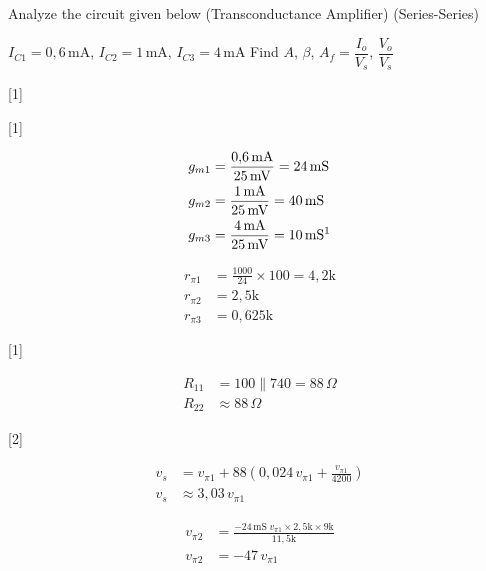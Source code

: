 \documentclass[11pt,a4paper]{article}
\begin{document}

\begin{ornek}
  Analyze the circuit given below (Transconductance Amplifier) (Series-Series)

  $I_{C1} = 0{,}6\,\mathrm{mA}$, $I_{C2} = 1\,\mathrm{mA}$, $I_{C3} = 4\,\mathrm{mA}$ \quad [$\beta = 100$, $r_o = \infty$] \quad Find $A$, $\beta$, $A_f = \dfrac{I_o}{V_s}$, $\dfrac{V_o}{V_s}$
\end{ornek}

[1]

[1]

\begin{align*}
  g_{m1} &= \frac{0{,}6\,\mathrm{mA}}{25\,\mathrm{mV}} = 24\,\mathrm{mS} \\
  g_{m2} &= \frac{1\,\mathrm{mA}}{25\,\mathrm{mV}} = 40\,\mathrm{mS} \\
  g_{m3} &= \frac{4\,\mathrm{mA}}{25\,\mathrm{mV}} = 10\,\mathrm{mS}\text{\footnotemark}
\end{align*}

\begin{align*}
  r_{\pi1} &= \frac{1000}{24}\times 100 = 4{,}2\mathrm{k} \\
  r_{\pi2} &= 2{,}5\mathrm{k} \\
  r_{\pi3} &= 0{,}625\mathrm{k}
\end{align*}

[1]

\begin{align*}
  R_{11} &= 100\parallel 740 = 88\,\Omega \\
  R_{22} &\approx 88\,\Omega
\end{align*}


[2]

\begin{align*}
  v_s &= v_{\pi1} + 88\left(0{,}024\,v_{\pi1} + \frac{v_{\pi1}}{4200}\right) \\
  v_s &\approx 3{,}03\,v_{\pi1}
\end{align*}

\begin{align*}
  v_{\pi2} &= \frac{-24\,\mathrm{mS}\; v_{\pi1}\times 2{,}5\mathrm{k}\times 9\mathrm{k}}{11{,}5\mathrm{k}} \\
  v_{\pi2} &= -47\,v_{\pi1}
\end{align*}
\end{document}
